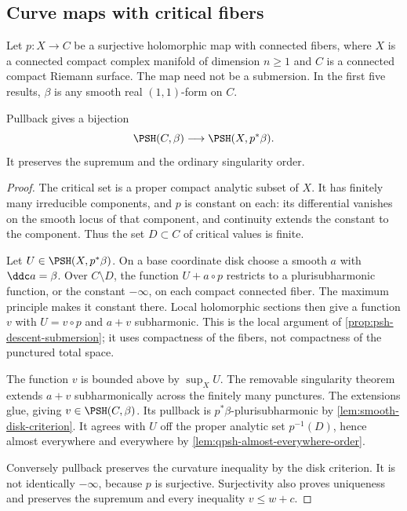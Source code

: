 \subsection{Curve maps with critical fibers}
\label{subsec:curve-map-critical-fibers}

Let $p:X\to C$ be a surjective holomorphic map with connected
fibers, where $X$ is a connected compact complex manifold of
dimension $n\geq1$ and $C$ is a connected compact Riemann surface.
The map need not be a submersion. In the first five results,
$\beta$ is any smooth real $(1,1)$-form on $C$.

\begin{proposition}\label{curve-map:potential-descent}
Pullback gives a bijection
\[
 \PSH(C,\beta)\longrightarrow\PSH(X,p^*\beta).
\]
It preserves the supremum and the ordinary singularity order.
\end{proposition}
\begin{proof}
The critical set is a proper compact analytic subset of $X$.
It has finitely many irreducible components, and $p$ is constant
on each: its differential vanishes on the smooth locus of that
component, and continuity extends the constant to the component.
Thus the set $D\subset C$ of critical values is finite.

Let $U\in\PSH(X,p^*\beta)$. On a base coordinate disk choose a
smooth $a$ with $\ddc a=\beta$. Over $C\setminus D$, the function
$U+a\circ p$ restricts to a plurisubharmonic function, or the
constant $-\infty$, on each compact connected fiber. The maximum
principle makes it constant there. Local holomorphic sections
then give a function $v$ with $U=v\circ p$ and $a+v$ subharmonic.
This is the local argument of \cref{prop:psh-descent-submersion};
it uses compactness of the fibers, not compactness of the
punctured total space.

The function $v$ is bounded above by $\sup_XU$. The removable
singularity theorem extends $a+v$ subharmonically across the
finitely many punctures. The extensions glue, giving
$v\in\PSH(C,\beta)$. Its pullback is $p^*\beta$-plurisubharmonic
by \cref{lem:smooth-disk-criterion}. It agrees with $U$ off the
proper analytic set $p^{-1}(D)$, hence almost everywhere and
everywhere by \cref{lem:qpsh-almost-everywhere-order}.

Conversely pullback preserves the curvature inequality by the
disk criterion. It is not identically $-\infty$, because $p$ is
surjective. Surjectivity also proves uniqueness and preserves
the supremum and every inequality $v\leq w+c$.
\end{proof}


